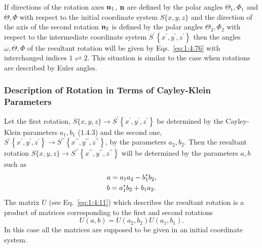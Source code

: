 If directions of the rotation axes \(\mathbf{n}_{1}\), \(\mathbf{n}\) are defined by the polar angles \(\Theta_{1}, \Phi_{1}\) and \(\Theta, \Phi\) with respect to the initial coordinate system \(S\{x, y, z\}\) and the direction of the axis of the second rotation \(\mathbf{n}_{2}\) is defined by the polar angles \(\Theta_{2}, \Phi_{2}\) with respect to the intermediate coordinate system \(S^{\prime}\left\{x^{\prime}, y^{\prime}, z^{\prime}\right\}\) then the angles \(\omega, \Theta, \Phi\) of the resultant rotation will be given by Eqs.~\eqref{eq:1:4:76} with interchanged indices \(1 \rightleftharpoons 2\). This situation is similar to the case when rotations are described by Euler angles.

\subsubsection{Description of Rotation in Terms of Cayley-Klein Parameters}
Let the first rotation, \(S\{x, y, z\} \rightarrow S^{\prime}\left\{x^{\prime}, y^{\prime}, z^{\prime}\right\}\) be determined by the Cayley-Klein parameters \(a_{1}, b_{1}\) (1.4.3) and the second one, \(S^{\prime}\left\{x^{\prime}, y^{\prime}, z^{\prime}\right\} \rightarrow S^{\prime \prime}\left\{x^{\prime \prime}, y^{\prime \prime}, z^{\prime \prime}\right\}\), by the parameters \(a_{2}, b_{2}\). Then the resultant rotation \(S\{x, y, z\} \rightarrow S^{\prime \prime}\left\{x^{\prime \prime}, y^{\prime \prime}, z^{\prime \prime}\right\}\) will be determined by the parameters \(a, b\) such as
\begin{align}
& a=a_{1} a_{2}-b_{1}^{*} b_{2},  \notag\\
& b=a_{1}^{*} b_{2}+b_{1} a_{2} .\label{eq:1:4:77}
\end{align}
The matrix \(U\) (see Eq.~\eqref{eq:1:4:11}) which describes the resultant rotation is a product of matrices corresponding to the first and second rotations
\begin{equation}
U(a, b)=U\left(a_{2}, b_{2}\right) U\left(a_{1}, b_{1}\right). \label{eq:1:4:78}
\end{equation}
In this case all the matrices are supposed to be given in an initial coordinate system.

